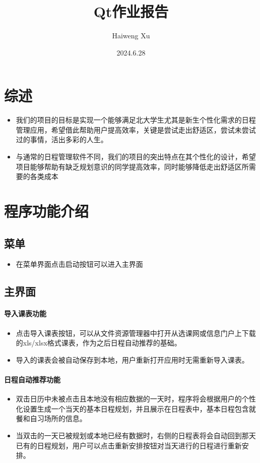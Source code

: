 \documentclass[11pt,hyperref,a4paper,UTF8]{ctexart}
\title{Qt作业报告}
\author{Haiweng Xu}
\date{2024.6.28}
\begin{document}
\begin{CJK}{UTF8}{gkai}

\maketitle
\tableofcontents

\section{综述}
\begin{itemize}
    \item 我们的项目的目标是实现一个能够满足北大学生尤其是新生个性化需求的日程管理应用，希望借此帮助用户提高效率，关键是尝试走出舒适区，尝试未尝试过的事情，活出多彩的人生。
    \item 与通常的日程管理软件不同，我们的项目的突出特点在其个性化的设计，希望项目能够帮助有缺乏规划意识的同学提高效率，同时能够降低走出舒适区所需要的各类成本
\end{itemize}

\section{ 程序功能介绍}

\subsection{ 菜单}
\begin{itemize}
    \item 在菜单界面点击启动按钮可以进入主界面
\end{itemize}

\subsection{ 主界面}

\paragraph{ 导入课表功能}
\begin{itemize}
    \item 点击导入课表按钮，可以从文件资源管理器中打开从选课网或信息门户上下载的xls/xlsx格式课表，作为之后日程自动推荐的基础。
    \item 导入的课表会被自动保存到本地，用户重新打开应用时无需重新导入课表。
\end{itemize}


\paragraph{ 日程自动推荐功能}
\begin{itemize}
    \item 双击日历中未被点击且本地没有相应数据的一天时，程序将会根据用户的个性化设置生成一个当天的基本日程规划，并且展示在日程表中，基本日程包含就餐和自习场所的信息。
    \item 当双击的一天已被规划或本地已经有数据时，右侧的日程表将会自动回到那天已有的日程规划，用户可以点击重新安排按钮对当天进行的日程进行重新安排。
\end{itemize}


\end{CJK}
\end{document}
